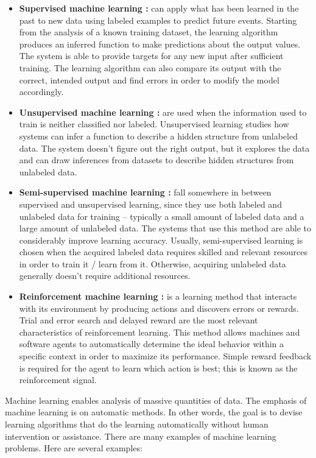 \documentclass[12pt]{article}
\numberwithin{equation}{section}
\numberwithin{table}{section}
\numberwithin{figure}{section}
\begin{document}
\begin{itemize}
	\item \textbf{Supervised machine learning :}
	can apply what has been learned in the past to new data using labeled examples to predict future events. Starting from the analysis of a known training dataset, the learning algorithm produces an inferred function to make predictions about the output values. The system is able to provide targets for any new input after sufficient training. The learning algorithm can also compare its output with the correct, intended output and find errors in order to modify the model accordingly.
	
	\item \textbf{Unsupervised machine learning :}
	are used when the information used to train is neither classified nor labeled. Unsupervised learning studies how systems can infer a function to describe a hidden structure from unlabeled data. The system doesn’t figure out the right output, but it explores the data and can draw inferences from datasets to describe hidden structures from unlabeled data.
	
	\item \textbf{Semi-supervised machine learning :}
	fall somewhere in between supervised and unsupervised learning, since they use both labeled and unlabeled data for training – typically a small amount of labeled data and a large amount of unlabeled data. The systems that use this method are able to considerably improve learning accuracy. Usually, semi-supervised learning is chosen when the acquired labeled data requires skilled and relevant resources in order to train it / learn from it. Otherwise, acquiring unlabeled data generally doesn’t require additional resources.
	
	\item \textbf{Reinforcement machine learning :}
	is a learning method that interacts with its environment by producing actions and discovers errors or rewards. Trial and error search and delayed reward are the most relevant characteristics of reinforcement learning. This method allows machines and software agents to automatically determine the ideal behavior within a specific context in order to maximize its performance. Simple reward feedback is required for the agent to learn which action is best; this is known as the reinforcement signal.
	
	
\end{itemize}

\noindent
Machine learning enables analysis of massive quantities of data. The emphasis of machine learning is on automatic methods. In other words, the goal is to devise learning algorithms that do the learning automatically without human intervention or assistance. There are many examples of machine learning problems. Here are several examples:
\end{document}
